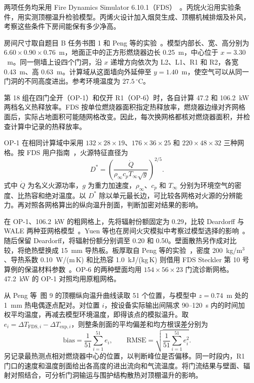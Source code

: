两项任务均采用 Fire Dynamics Simulator 6.10.1（FDS）~\cite{fdsuser}。丙烷火沿用实验条件，用实测顶棚温升检验模型。丙烯火设计加入烟炱生成、顶棚机械排烟及补风，考察这些条件下房间能保有多少净高。



房间尺寸取自题目 B 任务书图 1 和 Peng 等的实验~\cite{peng}。模型内部长、宽、高分别为 $6.60\times0.90\times0.76$~m，地面正中的正方形燃烧器边长 0.25~m，中心位于 $x=3.30$~m。同一侧墙上设四个门洞，沿 $x$ 递增方向依次为 L2、L1、R1 和 R2，各宽 0.43~m、高 0.63~m。计算域从这面墙向外延伸至 $y=1.40$~m，使空气可以从同一门洞的不同高度进出。参考环境温度为 $27.5\,^{\circ}$C。

第 18 组在四门全开（OP-1）和仅开 R1（OP-6）时，各自计算 47.2 和 106.2~kW 两档名义热释放率。FDS 按单位燃烧器面积指定热释放率，燃烧器边缘对齐网格面后，实际占地面积可能随网格改变。因此，每次换网格都核对燃烧器面积，并检查计算中记录的热释放率。

\clearpage
{}
OP-1 在相同计算域中采用 $132\times28\times19$、$176\times36\times25$ 和 $220\times48\times32$ 三种网格。按 FDS 用户指南~\cite{fdsuser}，火源特征直径为
\[
 D^*=\left(\frac{\dot Q}{\rho_\infty c_p T_\infty\sqrt{g}}\right)^{2/5}.
\]
式中 $\dot Q$ 为名义火源功率，$g$ 为重力加速度，$\rho_\infty$、$c_p$ 和 $T_\infty$ 分别为环境空气的密度、比热容和绝对温度。以 $D^*$ 除以单元最长边，可比较各网格对火源的分辨能力。再对照各网格算出的纵向温升剖面，判断加密对结果的影响。

在 OP-1、106.2~kW 的粗网格上，先将辐射份额固定为 0.29，比较 Deardorff 与 WALE 两种亚网格模型~\cite{fdstech}。Yuen 等也在房间火灾模拟中考察过模型选择的影响~\cite{yuen}。随后保留 Deardorff，将辐射份额分别调至 0.20 和 0.50。壁面散热另作成对比较，将绝热壁换成 15~mm 导热板。板厚取自 Peng 等的实验~\cite{peng}，密度 200~kg/m$^3$、导热系数 0.10~W/(m\,K) 和比热容 1.0~kJ/(kg\,K) 则借用 FDS Steckler 第 10 号算例的保温材料参数~\cite{steckler}。OP-6 的两种壁面均用 $154\times56\times23$ 门流诊断网格。47.2~kW 的 OP-1 对照均用原粗网格。

从 Peng 等~\cite{peng}图 9 的顶棚纵向温升曲线读取 51 个位置，与模型中 $z=0.74$~m 处的 1~mm 热电偶逐点配对。对位置 $i$，按设备实际输出间隔求 90--120~s 内的时间加权平均温度，再减去模型环境温度，即得该点的模拟温升。取 $e_i=\Delta T_{\mathrm{FDS},i}-\Delta T_{\mathrm{exp},i}$，则整条剖面的平均偏差和均方根误差分别为
\[
 \mathrm{bias}=\frac{1}{51}\sum_{i=1}^{51}e_i,\qquad
 \mathrm{RMSE}=\sqrt{\frac{1}{51}\sum_{i=1}^{51}e_i^2}.
\]
另记录最热测点相对燃烧器中心的位置，以判断峰位是否偏移。同一时段内，R1 门口的速度和温度剖面给出各高度的进出流向和气流温度。将门流结果与壁面、辐射对照结合，可分析门洞输运与围护结构散热对顶棚温升的影响。

